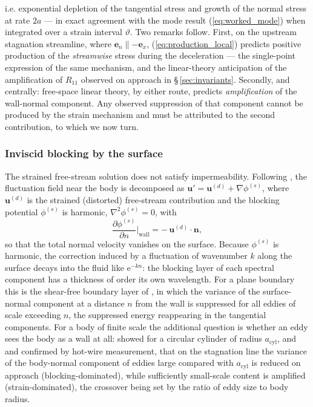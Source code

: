 \documentclass[lineno]{JFM-FLM_Au}
\begin{document}
i.e. exponential depletion of the tangential stress and growth of the
normal stress at rate $2a$ --- in exact agreement with the mode result
(\ref{eq:worked_mode}) when integrated over a strain interval
$\vartheta$. Two remarks follow. First, on the upstream stagnation
streamline, where $\boldsymbol{e}_n \parallel -\boldsymbol{e}_x$,
(\ref{eq:production_local}) predicts positive production of the
\emph{streamwise} stress during the deceleration --- the single-point
expression of the same mechanism, and the linear-theory anticipation of
the amplification of $R_{11}$ observed on approach in
\S\,\ref{sec:invariants}. Secondly, and centrally: free-space linear
theory, by either route, predicts \emph{amplification} of the wall-normal
component. Any observed suppression of that component cannot be produced
by the strain mechanism and must be attributed to the second contribution,
to which we now turn.

\subsubsection{Inviscid blocking by the surface}

The strained free-stream solution does not satisfy impermeability.
Following \citet{Hunt1973}, the fluctuation field near the body is
decomposed as
$\boldsymbol{u}' = \boldsymbol{u}^{(d)} + \nabla\phi^{(s)}$, where
$\boldsymbol{u}^{(d)}$ is the strained (distorted) free-stream
contribution and the blocking potential $\phi^{(s)}$ is harmonic,
$\nabla^2\phi^{(s)} = 0$, with
\begin{equation}
  \frac{\partial\phi^{(s)}}{\partial n}\bigg|_{\mathrm{wall}}
  = -\,\boldsymbol{u}^{(d)}\!\cdot\boldsymbol{n},
  \label{eq:blocking}
\end{equation}
so that the total normal velocity vanishes on the surface. Because
$\phi^{(s)}$ is harmonic, the correction induced by a fluctuation of
wavenumber $k$ along the surface decays into the fluid like
$\mathrm{e}^{-k n}$: the blocking layer of each spectral component has a
thickness of order its own wavelength. For a plane boundary this is the
shear-free boundary layer of \citet{HuntGraham1978}, in which the variance
of the surface-normal component at a distance $n$ from the wall is
suppressed for all eddies of scale exceeding $n$, the suppressed energy
reappearing in the tangential components. For a body of finite scale the
additional question is whether an eddy sees the body as a wall at all:
\citet{Hunt1973} showed for a circular cylinder of radius
$a_{\mathrm{cyl}}$, and \citet{Bearman1972} and
\citet{BritterHuntMumford1979} confirmed by hot-wire measurement, that on
the stagnation line the variance of the body-normal component of eddies
large compared with $a_{\mathrm{cyl}}$ is reduced on approach
(blocking-dominated), while sufficiently small-scale content is amplified
(strain-dominated), the crossover being set by the ratio of eddy size to
body radius.
\end{document}
